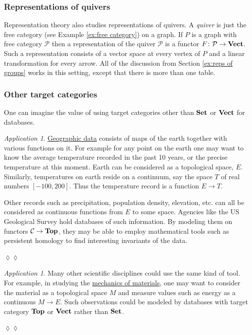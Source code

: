 \documentclass{book}
\def\mc{\mathcal}
\def\to{\rightarrow}
\def\taking{\colon}
\def\Top{{\bf Top}}
\def\Vect{{\bf Vect}}
\def\Set{{\bf Set}}
\def\mcC{\mc{C}}
\def\mcP{\mc{P}}
\theoremstyle{remark}
\newtheorem{app}[subsubsection]{Application}
\newenvironment{application}{\begin{app}}{\hspace*{\fill}$\lozenge\lozenge$\end{app}}
\theoremstyle{definition}
\begin{document}

\subsubsection{Representations of quivers}

Representation theory also studies representations of quivers. A {\em quiver} is just the free category (see Example \ref{ex:free category}) on a graph. If $P$ is a graph with free category $\mcP$ then a representation of the quiver $\mcP$ is a functor $F\taking\mcP\to\Vect$. Such a representation consists of a vector space at every vertex of $P$ and a linear transformation for every arrow. All of the discussion from Section \ref{ex:reps of groups} works in this setting, except that there is more than one table.


\subsubsection{Other target categories}\label{sec:other targets}

One can imagine the value of using target categories other than $\Set$ or $\Vect$ for databases. 

\begin{application}

\href{http://en.wikipedia.org/wiki/Geographic_data}{\text Geographic data} consists of maps of the earth together with various functions on it. For example for any point on the earth one may want to know the average temperature recorded in the past 10 years, or the precise temperature at this moment. Earth can be considered as a topological space, $E$. Similarly, temperatures on earth reside on a continuum, say the space $T$ of real numbers $[-100,200]$. Thus the temperature record is a function $E\to T$. 

Other records such as precipitation, population density, elevation, etc. can all be considered as continuous functions from $E$ to some space. Agencies like the US Geological Survey hold databases of such information. By modeling them on functors $\mcC\to\Top$, they may be able to employ mathematical tools such as persistent homology \cite{WeS} to find interesting invariants of the data.

\end{application}

\begin{application}

Many other scientific disciplines could use the same kind of tool. For example, in studying the \href{http://en.wikipedia.org/wiki/Strength_of_materials}{\text mechanics of materials}, one may want to consider the material as a topological space $M$ and measure values such as energy as a continuous $M\to E$. Such observations could be modeled by databases with target category $\Top$ or $\Vect$ rather than $\Set$.

\end{application}
\end{document}
